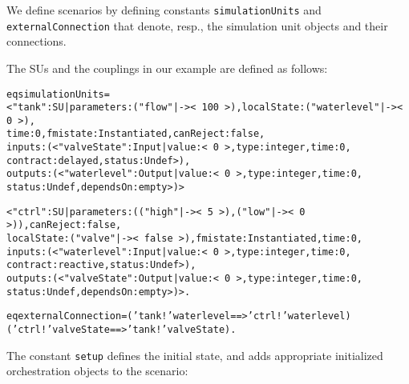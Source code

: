 
We define scenarios by defining constants \texttt{simulationUnits}
and \texttt{externalConnection} that denote, resp.,  the
simulation unit objects and  their connections. 

\begin{example}\label{ex:simulationunits}
The SUs and the couplings in our  example are defined as
follows:

\scriptsize
\begin{alltt}
eq simulationUnits = 
   < "tank" : SU | parameters : ("flow" |-> <\,100\,>),  localState : ("waterlevel" |-> <\,0\,>),
                   time : 0,  fmistate : Instantiated, canReject : false, 
                   inputs : (< "valveState" : Input | value : <\,0\,>, type : integer, time : 0,
                                                      contract : delayed, status : Undef >), 
                   outputs : (< "waterlevel" : Output | value : <\,0\,>, type : integer, time : 0,
                                                        status : Undef, dependsOn : empty >) >

   < "ctrl" : SU | parameters : (("high" |-> <\,5\,>) , ("low" |-> <\,0\,>)), canReject : false, 
                   localState : ("valve" |-> <\,false\,>), fmistate : Instantiated, time : 0, 
                   inputs : (< "waterlevel" : Input | value : <\,0\,>, type : integer, time : 0,
                                                      contract : reactive, status : Undef >), 
                   outputs : (< "valveState" : Output | value : <\,0\,>, type : integer, time : 0,
                                                        status : Undef, dependsOn : empty >) > .

eq externalConnection = ('tank ! 'waterlevel ==> 'ctrl ! 'waterlevel) 
                        ('ctrl ! 'valveState ==> 'tank ! 'valveState) .
\end{alltt}
\normalsize
\end{example}

The constant \texttt{setup} defines the initial state, and adds
appropriate initialized orchestration objects to the scenario:

